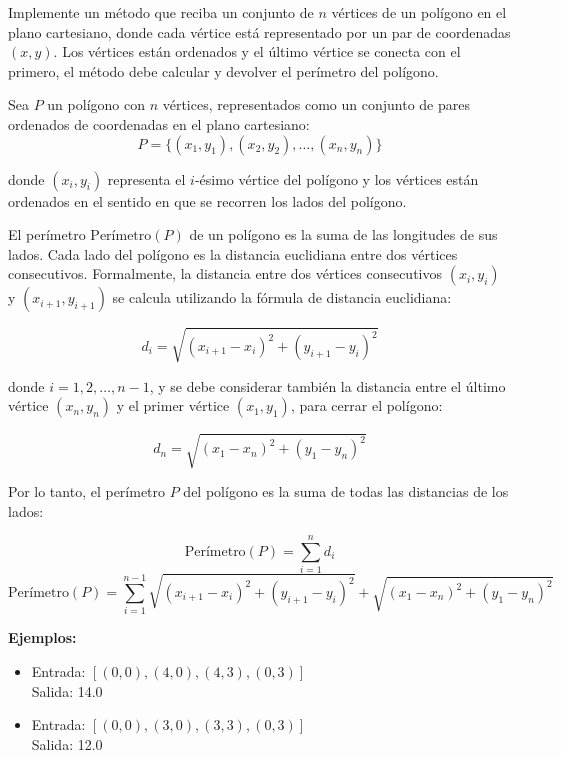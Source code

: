 Implemente un método que reciba un conjunto de \(n\) vértices de un polígono en el plano cartesiano, donde cada vértice está representado por un par de coordenadas \((x, y)\). Los vértices están ordenados y el último vértice se conecta con el primero, el método debe calcular y devolver el perímetro del polígono.
        
Sea \( P \) un polígono con \( n \) vértices, representados como un conjunto de pares ordenados de coordenadas en el plano cartesiano:
\[
P = \{ (x_1, y_1), (x_2, y_2), \dots, (x_n, y_n) \}
\]

donde \( (x_i, y_i) \) representa el \( i \)-ésimo vértice del polígono y los vértices están ordenados en el sentido en que se recorren los lados del polígono. 

El perímetro \( \text{Perímetro}(P) \) de un polígono es la suma de las longitudes de sus lados. Cada lado del polígono es la distancia euclidiana entre dos vértices consecutivos. Formalmente, la distancia entre dos vértices consecutivos \( (x_i, y_i) \) y \( (x_{i+1}, y_{i+1}) \) se calcula utilizando la fórmula de distancia euclidiana:

\[
d_i = \sqrt{(x_{i+1} - x_i)^2 + (y_{i+1} - y_i)^2}
\]

donde \( i = 1, 2, \dots, n-1 \), y se debe considerar también la distancia entre el último vértice \( (x_n, y_n) \) y el primer vértice \( (x_1, y_1) \), para cerrar el polígono:

\[
d_n = \sqrt{(x_1 - x_n)^2 + (y_1 - y_n)^2}
\]

Por lo tanto, el perímetro \( P \) del polígono es la suma de todas las distancias de los lados:

\[
\text{Perímetro}(P) = \sum_{i=1}^{n} d_i 
\]
\[
\text{Perímetro}(P) = \sum_{i=1}^{n-1} \sqrt{(x_{i+1} - x_i)^2 + (y_{i+1} - y_i)^2} + \sqrt{(x_1 - x_n)^2 + (y_1 - y_n)^2}
\]

\textbf{Ejemplos:}

\begin{itemize}
    \item Entrada: \([ (0, 0), (4, 0), (4, 3), (0, 3) ]\) \\
    Salida: 14.0
    \item Entrada: \([ (0, 0), (3, 0), (3, 3), (0, 3) ]\) \\
    Salida: 12.0
\end{itemize}